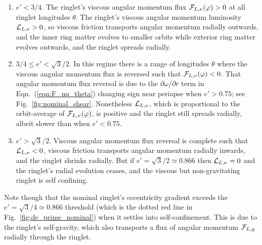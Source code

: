 \documentclass[preprint]{aastex62}
\begin{document}
\begin{enumerate}

\item $e'<3/4$. The ringlet's viscous angular momentum flux ${\cal F}_{L,\nu}(\varphi)>0$
at all ringlet longitudes $\theta$. The ringlet's viscous
angular momentum luminosity ${\cal L}_{L,\nu}>0$, so viscous friction transports angular momentum radially outwards,
and the inner ring matter evolves to smaller orbits while exterior ring matter evolves outwards, and
the ringlet spreads radially.

\item $3/4\le e'<\sqrt{3}/2$. In this regime there is a range of longitudes $\theta$
where the viscous angular momentum flux is reversed such that ${\cal F}_{L,\nu}(\varphi)<0$. 
That angular momentum flux reversal is due to the $\partial\omega/\partial r$
term in Eqn.\ (\ref{eqn:F_nu_theta}) changing sign near periapse when $e'>0.75$; 
see Fig.\ \ref{fig:nominal_shear}.
Nonetheless ${\cal L}_{L,\nu}$, which is proportional to the orbit-average of ${\cal F}_{L,\nu}(\varphi)$,
is positive and the ringlet still spreads radially, albeit slower than when $e'<0.75$.

\item $e'>\sqrt{3}/2$. Viscous angular momentum flux reversal is complete such that ${\cal L}_{L,\nu}<0$,
viscous friction transports angular momentum radially inwards, and the ringlet
shrinks radially. But if $e'=\sqrt{3}/2\simeq0.866$ then ${\cal L}_{L,\nu}=0$ and the ringlet's
radial evolution ceases, and the viscous but non-gravitating ringlet is self confining.

\end{enumerate}
 
Note though that the nominal ringlet's eccentricity gradient
exceeds the $e'=\sqrt{3}/4\simeq0.866$ threshold (which is
the dotted red line in Fig.\ \ref{fig:de_prime_nominal}) when it settles into
self-confinement. This is due to the ringlet's self-gravity,
which also transports a flux of angular momentum ${\cal F}_{L,g}$ radially through the ringlet.
\end{document}
